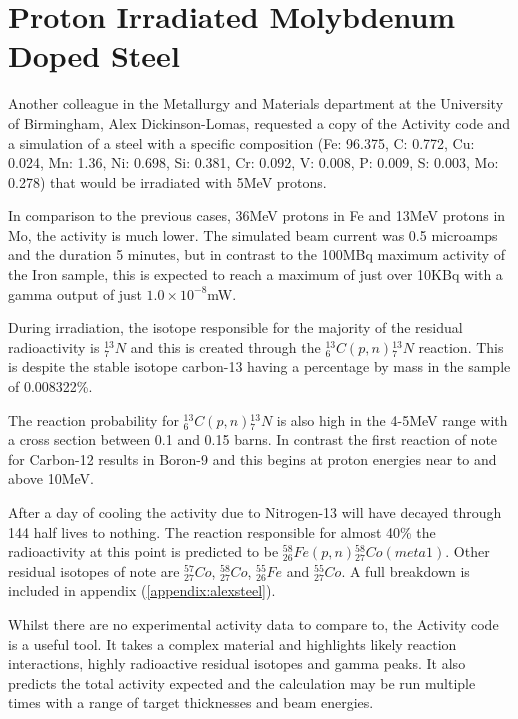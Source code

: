 \FloatBarrier
\section{Proton Irradiated Molybdenum Doped Steel}

Another colleague in the Metallurgy and Materials department at the University of Birmingham, Alex Dickinson-Lomas,  requested a copy of the Activity code and a simulation of a steel with a specific composition (Fe: 96.375, C: 0.772, Cu: 0.024, Mn: 1.36, Ni: 0.698, Si: 0.381, Cr: 0.092, V: 0.008, P: 0.009, S: 0.003, Mo: 0.278) that would be irradiated with 5MeV protons.

In comparison to the previous cases, 36MeV protons in \Gls{Fe} and 13MeV protons in \Gls{Mo}, the activity is much lower.  The simulated beam current was 0.5 microamps and the duration 5 minutes, but in contrast to the 100MBq maximum activity of the Iron sample, this is expected to reach a maximum of just over 10KBq with a gamma output of just $1.0 \times 10^{-8}$mW.

During irradiation, the isotope responsible for the majority of the residual radioactivity is ${}^{13}_{7}N$ and this is created through the ${}^{13}_{6}C(p, n){}^{13}_{7}N$ reaction.  This is despite the stable isotope carbon-13 having a percentage by mass in the sample of 0.008322\%.

The reaction probability for ${}^{13}_{6}C(p, n){}^{13}_{7}N$ is also high in the 4-5MeV range with a cross section between 0.1 and 0.15 barns.  In contrast the first reaction of note for Carbon-12 results in Boron-9 and this begins at proton energies near to and above 10MeV.

After a day of cooling the activity due to Nitrogen-13 will have decayed through 144 half lives to nothing.  The reaction responsible for almost 40\% the radioactivity at this point is predicted to be ${}^{58}_{26}Fe(p, n){}^{58}_{27}Co (meta 1)$.  Other residual isotopes of note are ${}^{57}_{27}Co$, ${}^{58}_{27}Co$, ${}^{55}_{26}Fe$ and ${}^{55}_{27}Co$.  A full breakdown is included in appendix (\ref{appendix:alexsteel}).

Whilst there are no experimental activity data to compare to, the Activity code is a useful tool.  It takes a complex material and highlights likely reaction interactions, highly radioactive residual isotopes and gamma peaks.  It also predicts the total activity expected and the calculation may be run multiple times with a range of target thicknesses and beam energies.




